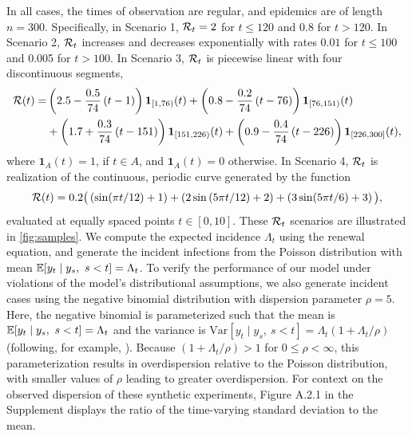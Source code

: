 In all cases, the times of observation are regular, and epidemics are of length
$n=300$. Specifically, in Scenario 1, $\mathcal{R}_t = 2$ for $t\leq 120$ and 0.8 for $t>120$. In
Scenario 2, $\mathcal{R}_t$ increases and decreases exponentially with rates $0.01$
for $t\leq 100$ and 0.005 for $t>100$. In Scenario 3, $\mathcal{R}_t$ is piecewise linear
with four discontinuous segments, 
\begin{equation}
  \begin{split}
    \mathcal{R}(t) =& \left(2.5 - \frac{0.5}{74}\left(t-1\right)\right) \boldsymbol{1}_{[1,76)}(t)
     + \left(0.8 - \frac{0.2}{74}\left(t-76\right)\right) \boldsymbol{1}_{[76,151)}(t) \\
    & + \left(1.7 + \frac{0.3}{74}\left(t-151\right)\right) \boldsymbol{1}_{[151,226)}(t)
       + \left(0.9 - \frac{0.4}{74}\left(t-226\right)\right) \boldsymbol{1}_{[226,300]}(t),
  \end{split}
\end{equation}
where $\boldsymbol{1}_{A}(t) = 1$, if $t\in A$, and $\boldsymbol{1}_{A}(t)=0$ otherwise. 
In Scenario 4, $\mathcal{R}_t$ is realization of the 
continuous, periodic curve generated by the function 
\begin{equation}
  \mathcal{R}(t) = 0.2 \big(\left(\sin(\pi t/12) + 1\right) + \left(2 \sin\left(5 \pi t / 12\right) + 2\right) 
  + \left(3 \sin(5\pi t / 6) + 3\right)\big),
\end{equation} 
evaluated at equally spaced points $t\in [0,10]$. These $\mathcal{R}_t$ scenarios are
illustrated in \autoref{fig:samples}. We compute the expected incidence
$\Lambda_t$ using the renewal equation, and generate the incident infections
from the Poisson distribution with mean $\mathbb{E}[y_t \mid y_s,\ s<t] = \Lambda_t$.
To verify the performance of our model under violations of the model's
distributional assumptions, we also generate incident cases using the negative
binomial distribution with dispersion parameter $\rho = 5$. Here, the negative
binomial is parameterized such that the mean is
$\mathbb{E}[y_t\mid y_s,\ s<t] = \Lambda_t$ and the variance is $\textrm{Var}[y_t \mid
y_s,\ s<t] = \Lambda_t(1 +
\Lambda_t / \rho)$ (following, for example, \cite{gressani2022epilps}). Because
$(1 + \Lambda_t / \rho)> 1$ for  $0\leq\rho <\infty$, this parameterization results
in overdispersion relative to the Poisson distribution, with smaller values of
$\rho$ leading to greater overdispersion. For context on the observed dispersion
of these synthetic experiments, Figure A.2.1 in the Supplement displays the
ratio of the time-varying standard deviation to the mean. 

